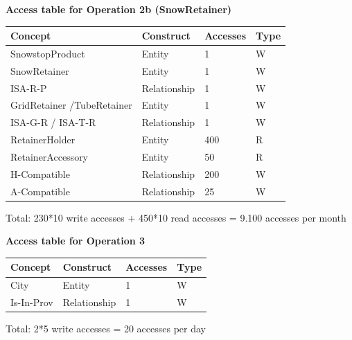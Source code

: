 \documentclass{article}[h]
\begin{document}
{\centering \textbf{Access table for Operation 2b (SnowRetainer)}\\}
\begin{table}[H]
  \def\arraystretch{1.10}%
  \centering
  \begin{tabular}{ | m{4cm} | m{4cm}| m{3cm} | m{2cm} |} 
    \hline
    {\textbf{\large Concept}} & {\textbf{\large Construct}} & {\textbf{\large Accesses}} & {\textbf{\large Type}} \\
    \hline
    \color[HTML]{3531FF} SnowstopProduct & Entity & 1 & W \\ 
    \hline
    \color[HTML]{3531FF} SnowRetainer & Entity & 1 & W \\ 
    \hline
    \color[HTML]{3531FF} ISA-R-P & Relationship & 1 & W \\ 
    \hline
    \color[HTML]{3531FF} GridRetainer /\newline TubeRetainer & Entity & 1 & W \\ 
    \hline
    \color[HTML]{3531FF} ISA-G-R / ISA-T-R & Relationship & 1 & W \\ 
    \hline
    \color[HTML]{3531FF} RetainerHolder & Entity & 400 & R \\ 
    \hline
    \color[HTML]{3531FF} RetainerAccessory & Entity & 50 & R \\ 
    \hline
    \color[HTML]{3531FF} H-Compatible & Relationship & 200 & W \\ 
    \hline
    \color[HTML]{3531FF} A-Compatible & Relationship & 25 & W \\ 
    \hline
  \end{tabular}
\end{table}
Total: 230*10 write accesses + 450*10 read accesses = 9.100 accesses per month

\pagebreak

{\centering \textbf{Access table for Operation 3}\\}
\begin{table}[H]
  \def\arraystretch{1.10}%
  \centering
  \begin{tabular}{ | m{4cm} | m{4cm}| m{3cm} | m{2cm} |} 
    \hline
    {\textbf{\large Concept}} & {\textbf{\large Construct}} & {\textbf{\large Accesses}} & {\textbf{\large Type}} \\
    \hline
    \color[HTML]{3531FF} City & Entity & 1 & W \\ 
    \hline
    \color[HTML]{3531FF} Is-In-Prov & Relationship & 1 & W \\ 
    \hline
  \end{tabular}
\end{table}
Total: 2*5 write accesses = 20 accesses per day
\end{document}
